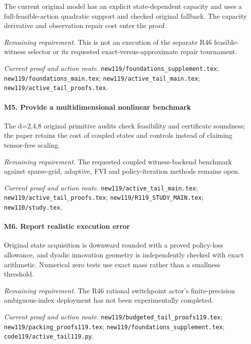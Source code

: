 The current original model has an explicit state-dependent capacity and uses a full-feasible-action quadratic support and checked original fallback. The capacity derivative and observation repair cost enter the proof.

\par\emph{Remaining requirement.} This is not an execution of the separate R46 feasible-witness selector or its requested exact-versus-approximate repair tournament.

\par\emph{Current proof and action route.} \nolinkurl{new119/foundations_supplement.tex}; \nolinkurl{new119/foundations_main.tex}; \nolinkurl{new119/active_tail_main.tex}; \nolinkurl{new119/active_tail_proofs.tex}.

\paragraph{M5. Provide a multidimensional nonlinear benchmark}

The d=2,4,8 original primitive audits check feasibility and certificate soundness; the paper retains the cost of coupled states and controls instead of claiming tensor-free scaling.

\par\emph{Remaining requirement.} The requested coupled witness-backend benchmark against sparse-grid, adaptive, FVI and policy-iteration methods remains open.

\par\emph{Current proof and action route.} \nolinkurl{new119/active_tail_main.tex}; \nolinkurl{new119/active_tail_proofs.tex}; \nolinkurl{new119/R119_STUDY_MAIN.tex}; \nolinkurl{new110/study.tex}.

\paragraph{M6. Report realistic execution error}

Original state acquisition is downward rounded with a proved policy-loss allowance, and dyadic innovation geometry is independently checked with exact arithmetic. Numerical zero tests use exact mass rather than a smallness threshold.

\par\emph{Remaining requirement.} The R46 rational switchpoint actor's finite-precision ambiguous-index deployment has not been experimentally completed.

\par\emph{Current proof and action route.} \nolinkurl{new119/budgeted_tail_proofs119.tex}; \nolinkurl{new119/packing_proofs119.tex}; \nolinkurl{new119/foundations_supplement.tex}; \nolinkurl{code119/active_tail119.py}.

